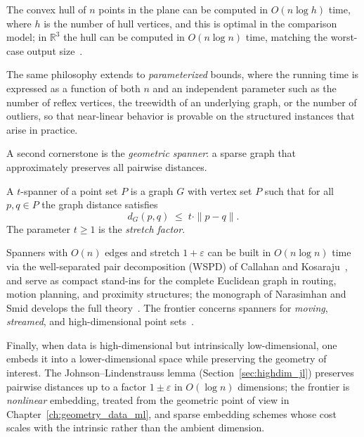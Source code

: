 \begin{theorem}\label{thm:frontiers_output_sensitive}
The convex hull of $n$ points in the plane can be computed in $O(n \log h)$
time, where $h$ is the number of hull vertices, and this is optimal in the
comparison model; in $\mathbb{R}^3$ the hull can be computed in $O(n \log n)$
time, matching the worst-case output size~\cite{berg2008}.
\end{theorem}

The same philosophy extends to \emph{parameterized} bounds, where the running
time is expressed as a function of both $n$ and an independent parameter such
as the number of reflex vertices, the treewidth of an underlying graph, or the
number of outliers, so that near-linear behavior is provable on the structured
instances that arise in practice.

A second cornerstone
is the \emph{geometric spanner}: a sparse graph that approximately preserves
all pairwise distances.

\begin{definition}\label{def:frontiers_spanner}
A $t$-spanner of a point set $P$ is a graph $G$ with vertex set $P$ such that
for all $p, q \in P$ the graph distance satisfies
\[
d_G(p,q) \;\le\; t \cdot \|p - q\|.
\]
The parameter $t \ge 1$ is the \emph{stretch factor}.
\end{definition}

Spanners with $O(n)$ edges and stretch $1+\varepsilon$ can be built in
$O(n \log n)$ time via the well-separated pair decomposition (WSPD) of Callahan
and Kosaraju~\cite{callahan1995}, and serve as compact stand-ins for the
complete Euclidean graph in routing, motion planning, and proximity structures;
the monograph of Narasimhan and Smid develops the full theory~\cite{smid2007}.
The frontier concerns spanners for \emph{moving}, \emph{streamed}, and
high-dimensional point sets~\cite{smid2007,guibas1998}.

Finally, when data is high-dimensional but
intrinsically low-dimensional, one embeds it into a lower-dimensional space
while preserving the geometry of interest. The Johnson--Lindenstrauss lemma
(Section~\ref{sec:highdim_jl}) preserves pairwise distances up to a factor
$1\pm\varepsilon$ in $O(\log n)$ dimensions; the frontier is \emph{nonlinear}
embedding, treated from the geometric point of view in
Chapter~\ref{ch:geometry_data_ml}, and sparse embedding schemes whose cost
scales with the intrinsic rather than the ambient dimension.

